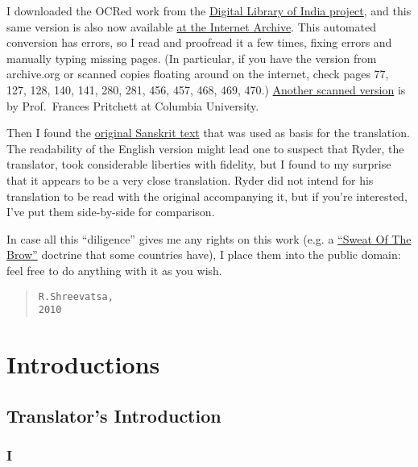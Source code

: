 \documentclass[article, twoside, 14pt]{memoir}
\renewenvironment{verbatim}{%
\begin{quote}%
\vskip -10pt%
\begin{alltt}\normalfont\large}{\end{alltt}%
\end{quote}%
\vskip -10pt
} %
\begin{document}
I downloaded the OCRed work from the
\href{http://www.new.dli.ernet.in/}{Digital Library of India project},
and this same version is also now available
\href{http://www.archive.org/details/panchatantra035159mbp}{at the Internet Archive}.
This automated conversion has errors, so I read and proofread it a
few times, fixing errors and manually typing missing pages. (In
particular, if you have the version from archive.org or scanned
copies floating around on the internet, check pages 77, 127, 128,
140, 141, 280, 281, 456, 457, 468, 469, 470.)
\href{http://www.columbia.edu/itc/mealac/pritchett/00litlinks/panchatantra_ryder/index.html}{Another scanned version}
is by Prof.~Frances Pritchett at Columbia University.

Then I found the
\href{http://books.google.com/books?id=cL_YfMZA3UgC}{original Sanskrit text}
that was used as basis for the translation. The readability of the
English version might lead one to suspect that Ryder, the
translator, took considerable liberties with fidelity, but I found
to my surprise that it appears to be a very close translation.
Ryder did not intend for his translation to be read with the
original accompanying it, but if you're interested, I've put them
side-by-side for comparison.

In case all this ``diligence'' gives me any rights on this work
(e.g. a
\href{http://www.gutenberg.org/wiki/Gutenberg:No_Sweat_of_the_Brow_Copyright}{``Sweat Of The Brow''}
doctrine that some countries have), I place them into the public
domain: feel free to do anything with it as you wish.

\begin{verbatim}
                                    R. Shreevatsa,
                                    2010
\end{verbatim}
\part{Introductions}

\chapter{Translator's Introduction}

\section{I}
\end{document}
